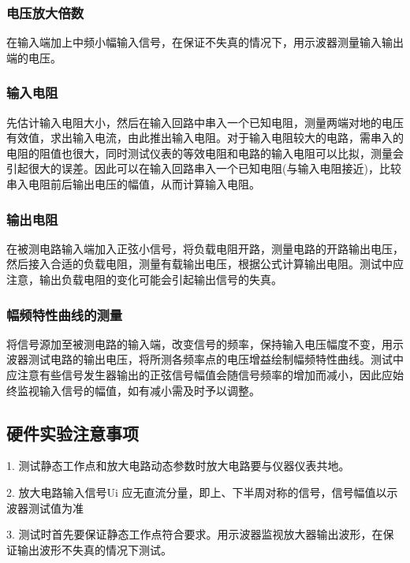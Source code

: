 \documentclass[UTF8,a4paper]{ctexart}
\begin{document}
\subsubsection{电压放大倍数}
在输入端加上中频小幅输入信号，在保证不失真的情况下，用示波器测量输入输出端的电压。
\subsubsection{输入电阻}
先估计输入电阻大小，然后在输入回路中串入一个已知电阻，测量两端对地的电压有效值，求出输入电流，由此推出输入电阻。对于输入电阻较大的电路，需串入的电阻的阻值也很大，同时测试仪表的等效电阻和电路的输入电阻可以比拟，测量会引起很大的误差。因此可以在输入回路串入一个已知电阻(与输入电阻接近)，比较串入电阻前后输出电压的幅值，从而计算输入电阻。
\subsubsection{输出电阻}
在被测电路输入端加入正弦小信号，将负载电阻开路，测量电路的开路输出电压，然后接入合适的负载电阻，测量有载输出电压，根据公式计算输出电阻。测试中应注意，输出负载电阻的变化可能会引起输出信号的失真。
\subsubsection{幅频特性曲线的测量}
将信号源加至被测电路的输入端，改变信号的频率，保持输入电压幅度不变，用示波器测试电路的输出电压，将所测各频率点的电压增益绘制幅频特性曲线。测试中应注意有些信号发生器输出的正弦信号幅值会随信号频率的增加而减小，因此应始终监视输入信号的幅值，如有减小需及时予以调整。
\subsection{硬件实验注意事项}
1. 测试静态工作点和放大电路动态参数时放大电路要与仪器仪表共地。

2. 放大电路输入信号Ui 应无直流分量，即上、下半周对称的信号，信号幅值以示波器测试值为准

3. 测试时首先要保证静态工作点符合要求。用示波器监视放大器输出波形，在保证输出波形不失真的情况下测试。
\end{document}
